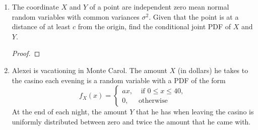 \documentclass[paper=usletter, fontsize=12pt]{article}
\begin{document}
\begin{enumerate}
\begin{proof}
            The expectations of the exponential distributions, $1/\lambda$,
            \begin{align*}
                E[A] & = 5\\
                E[B] & = 6.5\\
                E[C] & = 10
            \end{align*}
            Given the ratio of the units is $6:2:1$,
            \begin{align*}
                P(A) & = \frac{6}{9}\\
                P(B) & = \frac{2}{9}\\
                P(C) & = \frac{1}{9}
            \end{align*}
            Therefore, the expected lifetime of a unit purchased at random,
            \begin{align*}
                E & = \frac{5 \times 6}{9} + \frac{6.5 \times 2}{9} + \frac{10 \times 1}{9}\\
                & = \frac{53}{6} \qedhere
            \end{align*}
            \endgroup

        \end{proof}

        \item The coordinate $X$ and $Y$ of a point are independent zero mean
        normal random variables with common variances $\sigma^2$. Given that
        the point is at a distance of at least $c$ from the origin, find the
        conditional joint PDF of $X$ and $Y$.
        \begin{proof}
        \end{proof}

        \item Alexei is vacationing in Monte Carol. The amount $X$ (in dollars)
        he takes to the casino each evening is a random variable with a PDF of
        the form
        \begin{equation*}
            f_X(x)=
            \begin{cases}
                ax, & \text{ if } 0 \le x \le 40,\\
                0, & \text{otherwise}
            \end{cases}
        \end{equation*}
        At the end of each night, the amount $Y$ that he has when leaving the
        casino is uniformly distributed between zero and twice the amount that
        he came with.
        \begin{enumerate}


\end{enumerate}
\end{enumerate}
\end{document}

